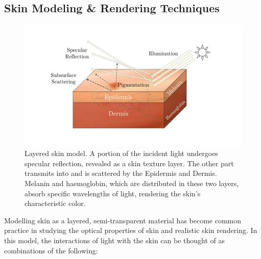 \begin{spacing}{1.5}
\section{Skin Modeling \& Rendering Techniques}

\begin{figure}[t]
    \centering
    \includegraphics[width=0.9\columnwidth]{Chapter2/skin_model2.pdf}
    \caption{Layered skin model. A portion of the incident light undergoes specular reflection, revealed as a skin texture layer. The other part transmits into and is scattered by the Epidermis and Dermis. Melanin and haemoglobin, which are distributed in these two layers, absorb specific wavelengths of light, rendering the skin's characteristic color.}
    \label{fig:skin_model}
\end{figure}

Modelling skin as a layered, semi-transparent material has become common practice in studying the optical properties of skin and realistic skin rendering\cite{10.5555/2383894.2383946}. In this model, the interactions of light with the skin can be thought of as combinations of the following:


\end{spacing}
